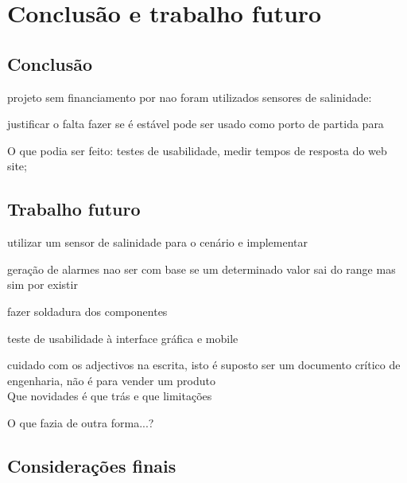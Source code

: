 \chapter{Conclusão e trabalho futuro}


\section{Conclusão}


projeto sem financiamento por nao foram utilizados sensores de salinidade: 


justificar o falta fazer
se é estável pode ser usado como porto de partida para 

O que podia ser feito: testes de usabilidade, medir tempos de resposta do web site; 





\section{Trabalho futuro}


utilizar um sensor de salinidade para o cenário e implementar

geração de alarmes nao ser com base se um determinado valor sai do range mas sim por existir 

fazer soldadura dos componentes 



teste de usabilidade à interface gráfica e mobile 



cuidado com os adjectivos na escrita, isto é suposto ser um documento crítico de engenharia, não é para vender um produto\\


Que novidades é que trás e que limitações


O que fazia de outra forma...?






\section{Considerações finais}